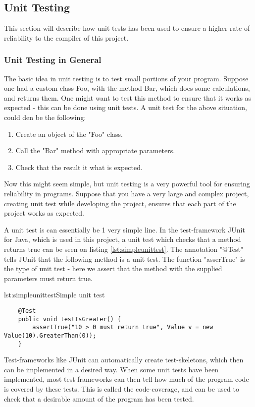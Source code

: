 \subsection{Unit Testing}
This section will describe how unit tests has been used to ensure a higher rate of reliability to the compiler of this project. 

\subsubsection{Unit Testing in General}
The basic idea in unit testing is to test small portions of your program. Suppose one had a custom class Foo, with the method Bar, which does some calculations, and returns them. One might want to test this method to ensure that it works as expected - this can be done using unit tests. A unit test for the above situation, could den be the following:
\begin{enumerate}
	\item Create an object of the "Foo" class.
	\item Call the "Bar" method with appropriate parameters. 
	\item Check that the result it what is expected.
\end{enumerate}
Now this might seem simple, but unit testing is a very powerful tool for ensuring reliability in programs. Suppose that you have a very large and complex project, creating unit test while developing the project, ensures that each part of the project works as expected.

A unit test is can essentially be 1 very simple line. In the test-framework JUnit for Java, which is used in this project, a unit test which checks that a method returns true can be seen on listing \ref{lst:simpleunittest}. The annotation "@Test" tells JUnit that the following method is a unit test. The function "asserTrue" is the type of unit test - here we assert that the method with the supplied parameters must return true.

\begin{code}{lst:simpleunittest}{Simple unit test}
\begin{lstlisting}
	@Test
	public void testIsGreater() {
	    assertTrue("10 > 0 must return true", Value v = new Value(10).GreaterThan(0));
	}
\end{lstlisting}
\end{code}

Test-frameworks like JUnit can automatically create test-skeletons, which then can be implemented in a desired way. When some unit tests have been implemented, most test-frameworks can then tell how much of the program code is covered by these tests. This is called the code-coverage, and can be used to check that a desirable amount of the program has been tested.

